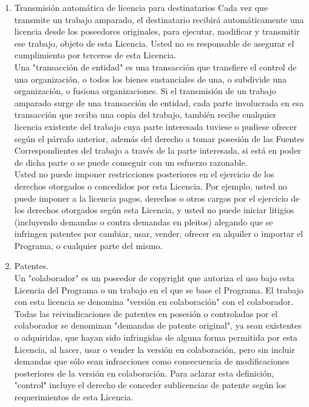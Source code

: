 \begin{enumerate}
		\item Transmisión automática de licencia para destinatarios Cada vez que transmite un trabajo amparado, el destinatario recibirá automáticamente una licencia desde los poseedores originales, para ejecutar, modificar y transmitir ese trabajo, objeto de esta Licencia. Usted no es responsable de asegurar el cumplimiento por terceros de esta Licencia.\\
		
		Una "transacción de entidad" es una transacción que transfiere el control de una organización, o todos los bienes sustanciales de una, o subdivide una organización, o fusiona organizaciones. Si el transmisión de un trabajo amparado surge de una transacción de entidad, cada parte involucrada en esa transacción que reciba una copia del trabajo, también recibe cualquier licencia existente del trabajo cuya parte interesada tuviese o pudiese ofrecer según el párrafo anterior, además del derecho a tomar posesión de las Fuentes Correspondientes del trabajo a través de la parte interesada, si está en poder de dicha parte o se puede conseguir con un esfuerzo razonable.\\
		
		Usted no puede imponer restricciones posteriores en el ejercicio de los derechos otorgados o concedidos por esta Licencia. Por ejemplo, usted no puede imponer a la licencia pagos, derechos o otros cargos por el ejercicio de los derechos otorgados según esta Licencia, y usted no puede iniciar litigios (incluyendo demandas o contra demandas en pleitos) alegando que se infringen patentes por cambiar, usar, vender, ofrecer en alquiler o importar el Programa, o cualquier parte del mismo.\\
		
		\item Patentes.\\
		
		Un "colaborador" es un poseedor de copyright que autoriza el uso bajo esta Licencia del Programa o un trabajo en el que se base el Programa. El trabajo con esta licencia se denomina "versión en colaboración" con el colaborador. Todas las reivindicaciones de patentes en posesión o controladas por el colaborador se denominan "demandas de patente original", ya sean existentes o adquiridas, que hayan sido infringidas de alguna forma permitida por esta Licencia, al hacer, usar o vender la versión en colaboración, pero sin incluir demandas que sólo sean infracciones como consecuencia de modificaciones posteriores de la versión en colaboración. Para aclarar esta definición, "control" incluye el derecho de conceder sublicencias de patente según los requerimientos de esta Licencia.\\
		

\end{enumerate}
